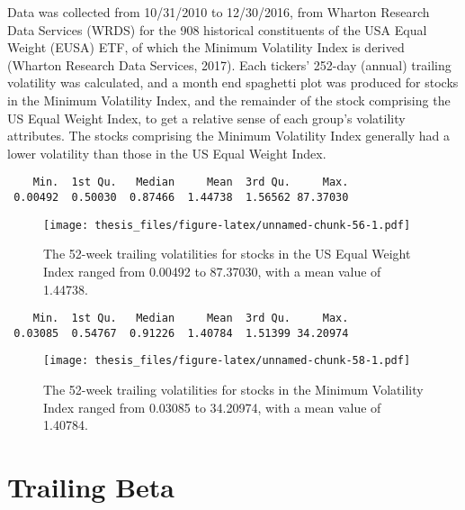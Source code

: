 \documentclass[12pt,twoside]{reedthesis}
\theoremstyle{definition}
\theoremstyle{definition}
\theoremstyle{definition}
\theoremstyle{remark}
\begin{document}
Data was collected from 10/31/2010 to 12/30/2016, from Wharton Research
Data Services (WRDS) for the 908 historical constituents of the USA
Equal Weight (EUSA) ETF, of which the Minimum Volatility Index is
derived (Wharton Research Data Services, 2017). Each tickers' 252-day
(annual) trailing volatility was calculated, and a month end spaghetti
plot was produced for stocks in the Minimum Volatility Index, and the
remainder of the stock comprising the US Equal Weight Index, to get a
relative sense of each group's volatility attributes. The stocks
comprising the Minimum Volatility Index generally had a lower volatility
than those in the US Equal Weight Index.
\begin{verbatim}
    Min.  1st Qu.   Median     Mean  3rd Qu.     Max. 
 0.00492  0.50030  0.87466  1.44738  1.56562 87.37030 
\end{verbatim}
\begin{figure}[htbp]
\centering
\texttt{[image: thesis\_files/figure-latex/unnamed-chunk-56-1.pdf]}
\caption{\label{fig:unnamed-chunk-56}The 52-week trailing volatilities for
stocks in the US Equal Weight Index ranged from 0.00492 to 87.37030,
with a mean value of 1.44738.}
\end{figure}
\begin{verbatim}
    Min.  1st Qu.   Median     Mean  3rd Qu.     Max. 
 0.03085  0.54767  0.91226  1.40784  1.51399 34.20974 
\end{verbatim}
\begin{figure}[htbp]
\centering
\texttt{[image: thesis\_files/figure-latex/unnamed-chunk-58-1.pdf]}
\caption{\label{fig:unnamed-chunk-58}The 52-week trailing volatilities for
stocks in the Minimum Volatility Index ranged from 0.03085 to 34.20974,
with a mean value of 1.40784.}
\end{figure}
\section{Trailing Beta}\label{trailing-beta}
\end{document}
